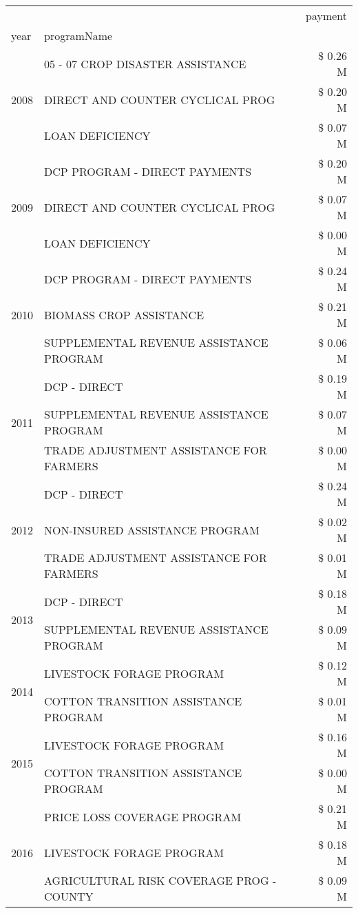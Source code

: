 \begin{tabular}{llr}
\toprule
 &  & payment \\
year & programName &  \\
\midrule
\multirow[t]{3}{*}{2008} & 05 - 07 CROP DISASTER ASSISTANCE & \$ 0.26 M \\
 & DIRECT AND COUNTER CYCLICAL PROG & \$ 0.20 M \\
 & LOAN DEFICIENCY & \$ 0.07 M \\
\cline{1-3}
\multirow[t]{3}{*}{2009} & DCP PROGRAM - DIRECT PAYMENTS & \$ 0.20 M \\
 & DIRECT AND COUNTER CYCLICAL PROG & \$ 0.07 M \\
 & LOAN DEFICIENCY & \$ 0.00 M \\
\cline{1-3}
\multirow[t]{3}{*}{2010} & DCP PROGRAM - DIRECT PAYMENTS & \$ 0.24 M \\
 & BIOMASS CROP ASSISTANCE & \$ 0.21 M \\
 & SUPPLEMENTAL REVENUE ASSISTANCE PROGRAM & \$ 0.06 M \\
\cline{1-3}
\multirow[t]{3}{*}{2011} & DCP - DIRECT & \$ 0.19 M \\
 & SUPPLEMENTAL REVENUE ASSISTANCE PROGRAM & \$ 0.07 M \\
 & TRADE ADJUSTMENT ASSISTANCE FOR FARMERS & \$ 0.00 M \\
\cline{1-3}
\multirow[t]{3}{*}{2012} & DCP - DIRECT & \$ 0.24 M \\
 & NON-INSURED ASSISTANCE PROGRAM & \$ 0.02 M \\
 & TRADE ADJUSTMENT ASSISTANCE FOR FARMERS & \$ 0.01 M \\
\cline{1-3}
\multirow[t]{2}{*}{2013} & DCP - DIRECT & \$ 0.18 M \\
 & SUPPLEMENTAL REVENUE ASSISTANCE PROGRAM & \$ 0.09 M \\
\cline{1-3}
\multirow[t]{2}{*}{2014} & LIVESTOCK FORAGE PROGRAM & \$ 0.12 M \\
 & COTTON TRANSITION ASSISTANCE PROGRAM & \$ 0.01 M \\
\cline{1-3}
\multirow[t]{2}{*}{2015} & LIVESTOCK FORAGE PROGRAM & \$ 0.16 M \\
 & COTTON TRANSITION ASSISTANCE PROGRAM & \$ 0.00 M \\
\cline{1-3}
\multirow[t]{3}{*}{2016} & PRICE LOSS COVERAGE PROGRAM & \$ 0.21 M \\
 & LIVESTOCK FORAGE PROGRAM & \$ 0.18 M \\
 & AGRICULTURAL RISK COVERAGE PROG - COUNTY & \$ 0.09 M \\

\end{tabular}
